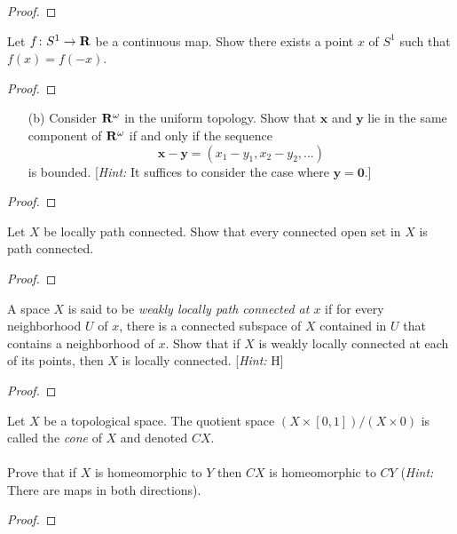 \begin{proof}
\end{proof}
\newpage
\begin{problem}[Munkres \S24, Ex.\,2]
Let $f\colon S^1\to\mathbf{R}$ be a continuous map. Show there exists a
point $x$ of $S^1$ such that $f(x)=f(-x)$.
\end{problem}
\begin{proof}
\end{proof}
\newpage
\begin{problem}[Munkres \S25, Ex.\,2(b)]
\begin{enumerate}[noitemsep]
\item[(b)] Consider $\mathbf{R}^\omega$ in the uniform topology. Show
  that $\mathbf{x}$ and $\mathbf{y}$ lie in the same component of
  $\mathbf{R}^\omega$ if and only if the sequence
  \[
    \mathbf{x}-\mathbf{y}=\left(x_1-y_1,x_2-y_2,...\right)
  \]
  is bounded. [\emph{Hint:} It suffices to consider the case
  where $\mathbf{y}=\mathbf{0}$.]
\end{enumerate}
\end{problem}
\begin{proof}
\end{proof}
\newpage
\begin{problem}[Munkres \S25, Ex.\,4]
Let $X$ be locally path connected. Show that every connected open
set in $X$ is path connected.
\end{problem}
\begin{proof}
\end{proof}
\newpage
\begin{problem}[Munkres \S25, Ex.\,6]
A space $X$ is said to be \emph{weakly locally path connected at
  $x$} if for every neighborhood $U$ of $x$, there is a connected
subspace of $X$ contained in $U$ that contains a neighborhood of
$x$. Show that if $X$ is weakly locally connected at each of its
points, then $X$ is locally connected. [\emph{Hint:} H]
\end{problem}
\begin{proof}
\end{proof}
\newpage
\begin{problem}[A]
Let $X$ be a topological space. The quotient space
$(X\times[0,1])/(X\times 0)$ is called the \emph{cone} of $X$ and
denoted $CX$.
\\\\
Prove that if $X$ is homeomorphic to $Y$ then $CX$ is
homeomorphic to $CY$ (\emph{Hint:} There are maps in both
directions).
\end{problem}
\begin{proof}
\end{proof}
